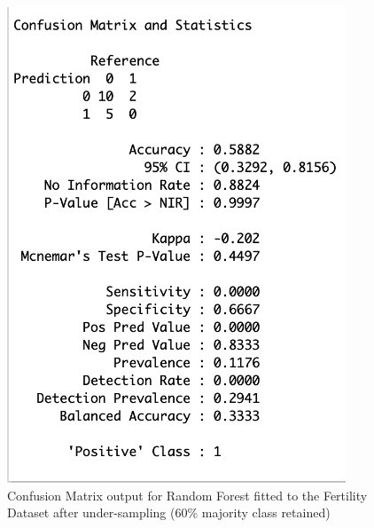 \begin{figure}[!htbp]
    \centering
    \begin{minipage}{0.45\textwidth}
        \centering
        \includegraphics[width=0.9\textwidth]{ThesisTemplate/appendix/images/Chapter5Appendix/ConfusionMatrix60/Fertility.png}
        \caption{Confusion Matrix output for Random Forest fitted to the Fertility Dataset after under-sampling (60\% majority class retained)}
        \label{fig:matrixFert60}
    \end{minipage}\hfill
    \begin{minipage}{0.45\textwidth}
        \centering

\end{minipage}
\end{figure}
